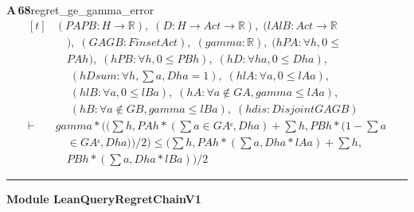 \documentclass[conference]{IEEEtran}
\theoremstyle{definition}
\newcommand{\lean}[1]{\textsf{\footnotesize #1}}
\begin{document}
\noindent\textbf{A\,68}\quad\lean{regret\_ge\_gamma\_error}
{\footnotesize\[ \begin{aligned}[t]
&(\mathit{PA} \mathit{PB} : \mathit{H} \to \mathbb{R} ),\; (\mathit{D} : \mathit{H} \to \mathit{Act} \to \mathbb{R} ),\; (\mathit{lA} \mathit{lB} : \mathit{Act} \to \mathbb{R}\\
&\quad ),\; (\mathit{GA} \mathit{GB} : \mathit{Finset} \mathit{Act}),\; (\mathit{gamma} : \mathbb{R} ),\; (\mathit{hPA} : \forall \mathit{h}, 0 \leq\\
&\quad \mathit{PA} \mathit{h}),\; (\mathit{hPB} : \forall \mathit{h}, 0 \leq \mathit{PB} \mathit{h}),\; (\mathit{hD} : \forall \mathit{h} \mathit{a}, 0 \leq \mathit{D} \mathit{h} \mathit{a}),\\
&\quad \; (\mathit{hDsum} : \forall \mathit{h}, \textstyle\sum \mathit{a}, \mathit{D} \mathit{h} \mathit{a} = 1),\; (\mathit{hlA} : \forall \mathit{a}, 0 \leq \mathit{lA} \mathit{a}),\\
&\quad \; (\mathit{hlB} : \forall \mathit{a}, 0 \leq \mathit{lB} \mathit{a}),\; (\mathit{hA} : \forall \mathit{a} \notin \mathit{GA}, \mathit{gamma} \leq \mathit{lA} \mathit{a}),\\
&\quad \; (\mathit{hB} : \forall \mathit{a} \notin \mathit{GB}, \mathit{gamma} \leq \mathit{lB} \mathit{a}),\; (\mathit{hdis} : \mathit{Disjoint} \mathit{GA} \mathit{GB})\\
\vdash\;&\mathit{gamma} * ((\textstyle\sum \mathit{h}, \mathit{PA} \mathit{h} * (\textstyle\sum \mathit{a} \in \mathit{GAᶜ}, \mathit{D} \mathit{h} \mathit{a}) + \textstyle\sum \mathit{h}, \mathit{PB} \mathit{h} * (1 - \textstyle\sum \mathit{a}\\
&\quad \in \mathit{GAᶜ}, \mathit{D} \mathit{h} \mathit{a})) / 2) \leq (\textstyle\sum \mathit{h}, \mathit{PA} \mathit{h} * (\textstyle\sum \mathit{a}, \mathit{D} \mathit{h} \mathit{a} * \mathit{lA} \mathit{a}) + \textstyle\sum \mathit{h},\\
&\quad \mathit{PB} \mathit{h} * (\textstyle\sum \mathit{a}, \mathit{D} \mathit{h} \mathit{a} * \mathit{lB} \mathit{a})) / 2
\end{aligned} \]}

\vspace{4pt}\noindent\rule{\columnwidth}{0.4pt}\par\vspace{2pt}
\noindent\textbf{Module \lean{LeanQueryRegretChainV1}}\par\vspace{3pt}
\end{document}
